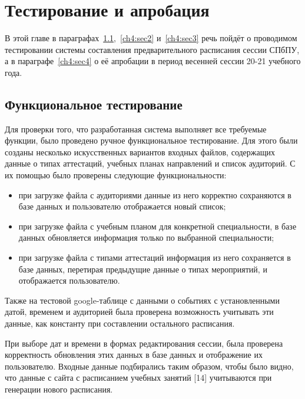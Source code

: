 \chapter{Тестирование и апробация} \label{ch4}

В этой главе в параграфах~\ref{ch4:sec1},~\ref{ch4:sec2} и~\ref{ch4:sec3} речь пойдёт о проводимом тестировании системы составления предварительного расписания сессии СПбПУ, а в параграфе~\ref{ch4:sec4} о её апробации в период весенней сессии 20-21 учебного года.


\section{Функциональное тестирование} \label{ch4:sec1}
Для проверки того, что разработанная система выполняет все требуемые функции, было проведено ручное функциональное тестирование. Для этого были созданы несколько искусственных вариантов входных файлов, содержащих данные о типах аттестаций, учебных планах направлений и список аудиторий. С их помощью было проверены следующие функциональности:
\begin{itemize}
	\item при загрузке файла с аудиториями данные из него корректно сохраняются в базе данных и пользователю отображается новый список;
	\item при загрузке файла с учебным планом для конкретной специальности, в базе данных обновляется информация только по выбранной специальности;
	\item при загрузке файла с типами аттестаций информация из него сохраняется в базе данных, перетирая предыдущие данные о типах мероприятий, и отображается пользователю.
\end{itemize} 	

Также на тестовой google-таблице с данными о событиях с установленными датой, временем и аудиторией была проверена возможность учитывать эти данные, как константу при составлении остального расписания.

При выборе дат и времени в формах редактирования сессии, была проверена корректность обновления этих данных в базе данных и отображение их пользователю. Входные данные подбирались таким образом, чтобы было видно, что данные с сайта с расписанием учебных занятий [14] учитываются при генерации нового расписания.

